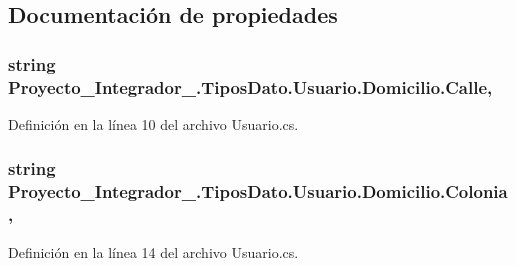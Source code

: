 \subsection{Documentación de propiedades}
\hypertarget{struct_proyecto___integrador__3_1_1_tipos_dato_1_1_usuario_1_1_domicilio_ac7f639c760a904e006a4ea6a3db05dff}{
\subsubsection[{Calle}]{\setlength{\rightskip}{0pt plus 5cm}string Proyecto\-\_\-\-Integrador\-\_.\-Tipos\-Dato.\-Usuario.\-Domicilio.\-Calle\hspace{0.3cm}{\ttfamily [get]}, {\ttfamily [set]}}}\label{struct_proyecto___integrador__3_1_1_tipos_dato_1_1_usuario_1_1_domicilio_ac7f639c760a904e006a4ea6a3db05dff}


Definición en la línea 10 del archivo Usuario.\-cs.

\hypertarget{struct_proyecto___integrador__3_1_1_tipos_dato_1_1_usuario_1_1_domicilio_a0782bc382740439c8b0340518e7ad972}{
\subsubsection[{Colonia}]{\setlength{\rightskip}{0pt plus 5cm}string Proyecto\-\_\-\-Integrador\-\_.\-Tipos\-Dato.\-Usuario.\-Domicilio.\-Colonia\hspace{0.3cm}{\ttfamily [get]}, {\ttfamily [set]}}}\label{struct_proyecto___integrador__3_1_1_tipos_dato_1_1_usuario_1_1_domicilio_a0782bc382740439c8b0340518e7ad972}


Definición en la línea 14 del archivo Usuario.\-cs.

